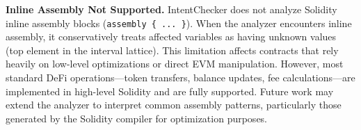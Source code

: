 \documentclass[pdflatex,sn-basic]{sn-jnl}%
\theoremstyle{thmstyleone}%
\theoremstyle{thmstyletwo}%
\theoremstyle{thmstylethree}%
\begin{document}
\smallskip
\noindent\textbf{Inline Assembly Not Supported.}
IntentChecker does not analyze Solidity inline assembly blocks (\texttt{assembly \{ ... \}}).
When the analyzer encounters inline assembly, it conservatively treats affected variables as having unknown values (top element in the interval lattice).
This limitation affects contracts that rely heavily on low-level optimizations or direct EVM manipulation.
However, most standard DeFi operations---token transfers, balance updates, fee calculations---are implemented in high-level Solidity and are fully supported.
Future work may extend the analyzer to interpret common assembly patterns,
particularly those generated by the Solidity compiler for optimization purposes.

%
%
%
%
%
%
%
\end{document}
